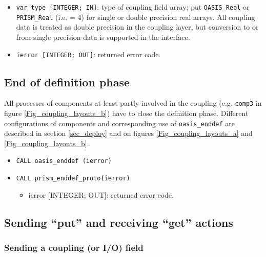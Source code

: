 \begin{itemize}
\begin{itemize}
{      IN]}: vector of integers giving the minimum and maximum index
    for each dimension of the coupling field array; for the current
    OASIS3-MCT version, the minimum index has to be 1 and the maximum
    index has to be the extent of the dimension.
  \item {\tt var\_type [INTEGER; IN]}: type of coupling field array;
    put {\tt OASIS\_Real} or {\tt PRISM\_Real} (i.e. = 4) for single
    or double precision real arrays.  All coupling data is treated as
    double precision in the coupling layer, but conversion to or from
    single precision data is supported in the interface.
  \item {\tt ierror [INTEGER; OUT]}: returned error code.
  \end{itemize}
\end{itemize}

\subsection{End of definition phase}
\label{subsubsec_Endofdefinition}
All processes of components at least partly involved in the coupling (e.g. {\tt comp3} in figure
    \ref{Fig_coupling_layouts_b}) have to close the definition phase. Different configurations of components and corresponding use of {\tt oasis\_enddef} are described in section \ref{sec_deploy} and on figures \ref{Fig_coupling_layouts_a} and \ref{Fig_coupling_layouts_b}.
\begin{itemize}
\item {\tt CALL oasis\_enddef (ierror)}
\item {\tt CALL prism\_enddef\_proto(ierror)}
  \begin{itemize}
  \item ierror [INTEGER; OUT]: returned error code.
  \end{itemize}
\end{itemize}


\subsection{Sending ``put'' and receiving ``get'' actions}
\label{subsubsec_sendingreceiving}

\subsubsection{Sending a coupling (or I/O) field}
\label{prismput}

